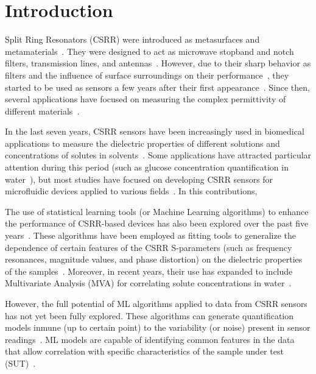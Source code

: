\documentclass[journal,twoside,web]{ieeecolor}
\begin{document}
\section{Introduction}
\label{sec:intro}
 Split Ring Resonators (CSRR) were introduced as metasurfaces and metamaterials~\cite{falcone2004, Baena2005}. They were designed to act as microwave stopband and notch filters, transmission lines, and antennas~\cite{GGarcia2005, Bonache2006, Mandal2006, Gil2007, Velez2008, Zhang2009}. However, due to their sharp behavior as filters and the influence of surface surroundings on their performance~\cite{Grzegorczyk2005, Stevanovic2006, Bonache2006}, they started to be used as sensors a few years after their first appearance~\cite{Boybay2012}. Since then, several applications have focused on measuring the complex permittivity of different materials~\cite{Song2013, Lee2014, Lee2014_2, Ansari2015, Standaert2017, Su2019}.

In the last seven years, CSRR sensors have been increasingly used in biomedical applications to measure the dielectric properties of different solutions and concentrations of solutes in solvents~\cite{Velez2018, Omer2021, Zhang2019}. Some applications have attracted particular attention during this period (such as glucose concentration quantification in water~\cite{Omer2021, Martinic2025}), but most studies have focused on developing CSRR sensors for microfluidic devices applied to various fields~\cite{Patel2022, Jiang2023, Liu2024, Zhang2024}. In this contributions,  

The use of statistical learning tools (or Machine Learning algorithms) to enhance the performance of CSRR-based devices has also been explored over the past five years~\cite{Prakash2022, Harrison2020, Kazemi2022, Abdolrazzaghi2023}. These algorithms have been employed as fitting tools to generalize the dependence of certain features of the CSRR S-parameters (such as frequency resonances, magnitude values, and phase distortion)  on the dielectric properties of the samples~\cite{Martinic2025}. Moreover, in recent years, their use has expanded to include Multivariate Analysis (MVA) for correlating solute concentrations in water~\cite{Trovarello2024}.

However, the full potential of ML algorithms applied to data from CSRR sensors has not yet been fully explored. These algorithms can generate quantification models inmune (up to certain point) to the variability (or noise) present in sensor readings~\cite{Mitchell1997, Wold1987, Wold2001, Nirmal2021}. ML models are capable of identifying common features in the data that allow correlation with specific characteristics of the sample under test (SUT)~\cite{Loutchanwot2022}. 
\end{document}
